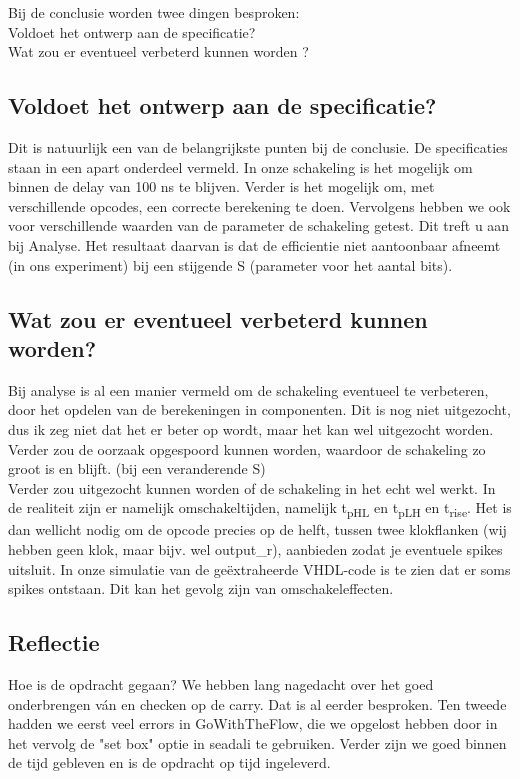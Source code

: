 \documentclass{article}
\begin{document}
\newcommand{\tss}{\textsubscript}
Bij de conclusie worden twee dingen besproken: \\
Voldoet het ontwerp aan de specificatie? \\
Wat zou er eventueel verbeterd kunnen worden ?
\subsection{Voldoet het ontwerp aan de specificatie?}
Dit is natuurlijk een van de belangrijkste punten bij de conclusie. De specificaties staan in een apart onderdeel vermeld. In onze schakeling is het mogelijk om binnen de delay van 100 ns te blijven. Verder is het mogelijk om, met verschillende opcodes, een correcte berekening te doen. Vervolgens hebben we ook voor verschillende waarden van de parameter de schakeling getest. Dit treft u aan bij Analyse. Het resultaat daarvan is dat de efficientie niet aantoonbaar afneemt (in ons experiment) bij een stijgende S (parameter voor het aantal bits). \newline \\
 \subsection{Wat zou er eventueel verbeterd kunnen worden?}
Bij analyse is al een manier vermeld om de schakeling eventueel te verbeteren, door het opdelen van de berekeningen in componenten. Dit is nog niet uitgezocht, dus ik zeg niet dat het er beter op wordt, maar het kan wel uitgezocht worden. 
Verder zou de oorzaak opgespoord kunnen worden, waardoor de schakeling zo groot is en blijft. (bij een veranderende S) \newline \\
Verder zou uitgezocht kunnen worden of de schakeling in het echt wel werkt. In de realiteit zijn er namelijk omschakeltijden, namelijk t\tss{pHL} en t\tss{pLH} en t\tss{rise}. Het is dan wellicht nodig om de opcode precies op de helft,  tussen twee klokflanken (wij hebben geen klok, maar bijv. wel output\_r), aanbieden zodat je eventuele spikes uitsluit.  In onze simulatie van de geëxtraheerde VHDL-code is te zien dat er soms spikes ontstaan. Dit kan het gevolg zijn van omschakeleffecten. \newline \\
\subsection{Reflectie}
Hoe is de opdracht gegaan? We hebben lang nagedacht over het goed onderbrengen ván en checken op de carry. Dat is al eerder besproken. Ten tweede hadden we eerst veel errors in GoWithTheFlow, die we opgelost hebben door in het vervolg de "set box" optie in seadali te gebruiken. Verder zijn we goed binnen de tijd gebleven en is de opdracht op tijd ingeleverd. 
\end{document}
